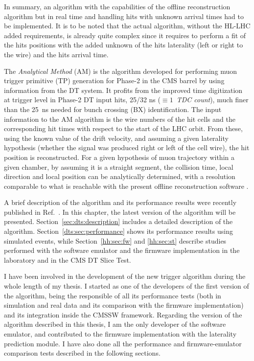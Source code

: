 \documentclass[../main.tex]{subfiles}
\begin{document}
In summary, an algorithm with the capabilities of the offline reconstruction algorithm but in real time and handling hits with unknown arrival times had to be implemented. It is to be noted that the actual algorithm, without the HL-LHC added requirements, is already quite complex since it requires to perform a fit of the hits positions with the added unknown of the hits laterality (left or right to the wire) and the hits arrival time.

The \textit{Analytical Method} (AM) \cite{dts:intro:am} is the algorithm developed for performing muon trigger primitive (TP) generation for Phase-2 in the CMS barrel by using information from the DT system. It profits from the improved time digitization at trigger level in Phase-2 DT input hits, 25/32 ns ($\equiv1$~\textit{TDC count}), much finer than the 25~ns needed for bunch crossing (BX) identification. The input information to the AM algorithm is the wire numbers of the hit cells and the corresponding hit times with respect to the start of the LHC orbit. From these, using the known value of the drift velocity, and assuming a given laterality hypothesis (whether the signal was produced right or left of the cell wire), the hit position is reconstructed. For a given hypothesis of muon trajectory within a given chamber, by assuming it is a straight segment, the collision time, local direction and local position can be analytically determined, with a resolution comparable to what is reachable with the present offline reconstruction software \cite{intro:id:muon_7tev}.

A brief description of the algorithm and its performance results were recently published in Ref.~\cite{dts:intro:am}. In this chapter, the latest version of the algorithm will be presented. Section~\ref{sec:dts:description} includes a detailed description of the algorithm. Section~\ref{dts:sec:performance} shows its performance results using simulated events, while Section~\ref{hh:sec:fw} and \ref{hh:sec:st} describe studies performed with the software emulator and the firmware implementation in the laboratory and in the CMS DT Slice Test.

I have been involved in the development of the new trigger algorithm during the whole length of my thesis. I started as one of the developers of the first version of the algorithm, being the responsible of all its performance tests (both in simulation and real data and its comparison with the firmware implementation) and its integration inside the CMSSW framework. Regarding the version of the algorithm described in this thesis, I am the only developer of the software emulator, and contributed to the firmware implementation with the laterality prediction module. I have also done all the performance and firmware-emulator comparison tests described in the following sections.
\end{document}
